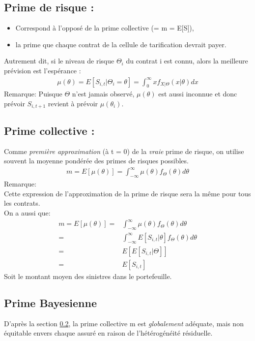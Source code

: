 \documentclass[11pt,french]{report}
\begin{document}
\subsection{Prime de risque :}
\begin{itemize}
\item Correspond à l'opposé de la prime collective (= m = E[S]),
\item la prime que chaque contrat de la cellule de tarification devrait payer.
\end{itemize}
Autrement dit, si le niveau de risque $\Theta_i$ du contrat i est connu, alors la meilleure prévision est l'espérance :
\begin{align*}
\mu(\theta) = E[S_{i,t}|\Theta_i = \theta] = \int_{0}^{\infty} x f_{X|\Theta}(x|\theta)dx
\end{align*}
Remarque: Puisque $\Theta$ n'est jamais observé, $\mu(\theta)$ est aussi inconnue et donc prévoir $S_{i, t+1}$ revient à prévoir $\mu(\theta_i)$.

\subsection{Prime collective :}
\label{sec:sub:prime collective}
Comme \emph{première approximation} (à t = 0) de la \textit{vraie} prime de risque, on utilise souvent la moyenne pondérée des primes de risques possibles.
\begin{align*}
m = E[\mu(\theta)] = \int_{-\infty}^{\infty} \mu(\theta) f_{\Theta}(\theta)d\theta
\end{align*}
Remarque:\\
Cette expression de l'approximation de la prime de risque sera la même pour tous les contrats.\\
On a aussi que:
\begin{align*}
m = E[\mu(\theta)] =& \int_{-\infty}^{\infty} \mu(\theta) f_{\Theta}(\theta)d\theta \\
=& \int_{-\infty}^{\infty} E[S_{i,t}|\theta] f_{\Theta}(\theta)d\theta \\
=& E[E[S_{i,t}|\Theta]]\\
=& E[S_{i,t}]
\end{align*}
Soit le montant moyen des sinistres dans le portefeuille.

\subsection{Prime Bayesienne}
D'après la section \ref{sec:sub:prime collective}, la prime collective m est \emph{globalement} adéquate, mais non équitable envers chaque assuré en raison de l'hétérogénéité résiduelle. 
\end{document}

